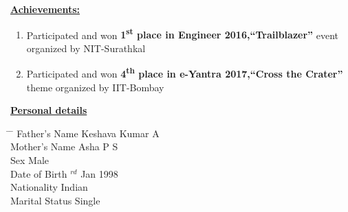 \documentclass[10pt]{article}
\begin{document}
	\underline{\textbf{\Large{Achievements:}}}
	\begin{enumerate}
		\item{Participated and won \textbf{1\textsuperscript{st}
				place in Engineer 2016,“Trailblazer”} event organized
			by NIT-Surathkal}
		\item{Participated and won \textbf{4\textsuperscript{th}
				place in e-Yantra 2017,“Cross the Crater”} theme
			organized by IIT-Bombay}	
	\end{enumerate}

	\hfill
	
	\underline{\textbf{\Large{Personal details}}}
	
	\parbox{1.5\textwidth}{ %
		\begin{tabbing} %
			\hspace{3cm} \= \hspace{4cm} \= \kill %
			{ Father's Name} \> Keshava Kumar A\\
			{ Mother's Name} \> Asha P S\\
			{ Sex} \> Male\\
			{ Date of Birth} $^{rd}$ Jan 1998  \\ 
			{ Nationality} \> Indian \\
			{ Marital Status} \> Single
	\end{tabbing}}
\end{document}
